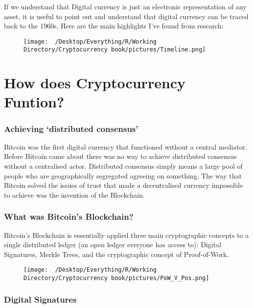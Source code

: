 \documentclass[]{book}
\theoremstyle{definition}
\theoremstyle{definition}
\theoremstyle{definition}
\theoremstyle{remark}
\begin{document}
If we understand that Digital currency is just an electronic
representation of any asset, it is useful to point out and understand
that digital currency can be traced back to the 1960s. Here are the main
highlights I've found from research:

\begin{figure}[htbp]
\centering
\texttt{[image: ~/Desktop/Everything/R/Working Directory/Cryptocurrency book/pictures/Timeline.png]}
\caption{}
\end{figure}

\chapter{How does Cryptocurrency
Funtion?}\label{how-does-cryptocurrency-funtion}

\subsection{\texorpdfstring{Achieving `distributed
consensus'}{Achieving distributed consensus}}\label{achieving-distributed-consensus}

Bitcoin was the first digital currency that functioned without a central
mediator. Before Bitcoin came about there was no way to achieve
distributed consensus without a centralised actor. Distributed consensus
simply means a large pool of people who are geographically segregated
agreeing on something. The way that Bitcoin solved the issues of trust
that made a decentralised currency impossible to achieve was the
invention of the Blockchain.

\subsection{What was Bitcoin's
Blockchain?}\label{what-was-bitcoins-blockchain}

Bitcoin's Blockchain is essentially applied three main cryptographic
concepts to a single distributed ledger (an open ledger everyone has
access to): Digital Signatures, Merkle Trees, and the cryptographic
concept of Proof-of-Work.

\begin{figure}[htbp]
\centering
\texttt{[image: ~/Desktop/Everything/R/Working Directory/Cryptocurrency book/pictures/PoW\_V\_Pos.png]}
\caption{}
\end{figure}

\subsection{Digital Signatures}\label{digital-signatures}
\end{document}

